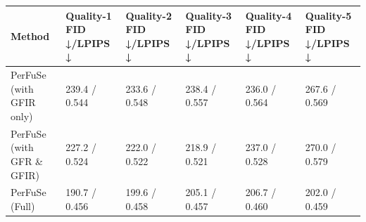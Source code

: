 \begin{tabular}{llllll}
\toprule
Method & Quality-1 FID ↓/LPIPS ↓ & Quality-2 FID ↓/LPIPS ↓ & Quality-3 FID ↓/LPIPS ↓ & Quality-4 FID ↓/LPIPS ↓ & Quality-5 FID ↓/LPIPS ↓ \\
\midrule
PerFuSe (with GFIR only) & 239.4 / 0.544 & 233.6 / 0.548 & 238.4 / 0.557 & 236.0 / 0.564 & 267.6 / 0.569 \\
PerFuSe (with GFR \& GFIR) & 227.2 / 0.524 & 222.0 / 0.522 & 218.9 / 0.521 & 237.0 / 0.528 & 270.0 / 0.579 \\
PerFuSe (Full) & 190.7 / 0.456 & 199.6 / 0.458 & 205.1 / 0.457 & 206.7 / 0.460 & 202.0 / 0.459 \\
\bottomrule
\end{tabular}
